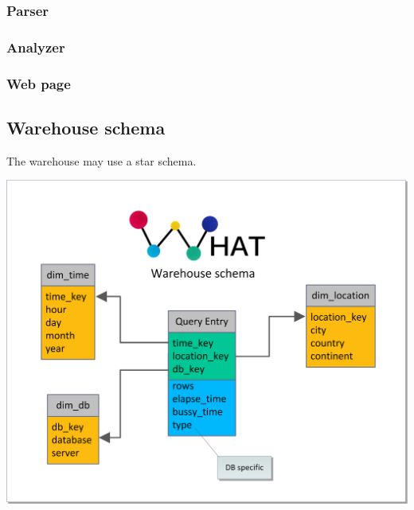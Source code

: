 \subsubsection{Parser}
\subsubsection{Analyzer}
\subsubsection{Web page}

\subsection{Warehouse schema}
The warehouse may use a star schema.
\begin{center}
\includegraphics[width=1\linewidth]{Pictures/WareHouseSchema.png}
\end{center}   